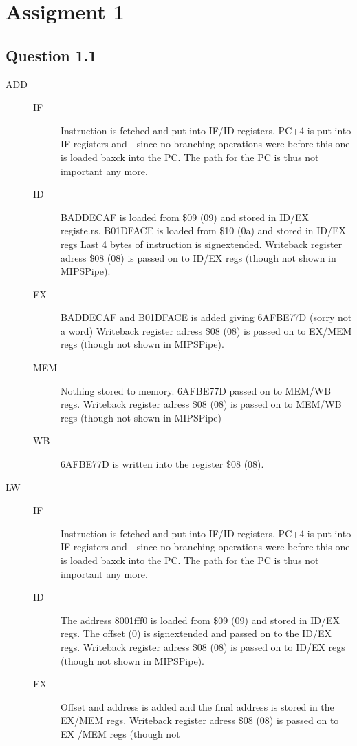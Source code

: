 \section{Assigment 1}
\subsection{Question 1.1}
\begin{description}
\item[ADD]
	\begin{description}
	\item[IF]
	 Instruction is fetched and put into IF/ID registers.
	 PC+4 is put into IF registers and - since no branching operations were before this one is loaded baxck into the PC. The path for the PC is thus not important any more.
	\item[ID]
	 BADDECAF is loaded from \$09 (09) and stored in ID/EX registe.rs.
	 B01DFACE is loaded from \$10 (0a) and stored in ID/EX regs
	 Last 4 bytes of instruction is signextended.
	 Writeback register adress \$08 (08) is passed on to ID/EX regs (though not
	 shown in MIPSPipe).
	\item[EX]
	 BADDECAF and B01DFACE is added giving 6AFBE77D (sorry not a word)
	 Writeback register adress \$08 (08) is passed on to EX/MEM regs (though not
	 shown in MIPSPipe).
	\item[MEM]
	 Nothing stored to memory.
	 6AFBE77D passed on to MEM/WB regs.
	 Writeback register adress \$08 (08) is passed on to MEM/WB regs (though not
	 shown in MIPSPipe)
	\item[WB]
	 6AFBE77D is written into the register \$08 (08). 
	\end{description}	
\item[LW]
	\begin{description}
	\item[IF]
	 Instruction is fetched and put into IF/ID registers.
	 PC+4 is put into IF registers and - since no branching operations were before this one is loaded baxck into the PC. The path 	for the PC is thus not important any more.
	\item[ID]
	 The address 8001fff0 is loaded from \$09 (09) and stored in ID/EX regs.
	 The offset (0) is signextended and passed on to the ID/EX regs.
	 Writeback register adress \$08 (08) is passed on to ID/EX regs (though not
	 shown in MIPSPipe).
	\item[EX]
	 Offset and address is added and the final address is stored in the EX/MEM regs.
	 Writeback register adress \$08 (08) is passed on to EX /MEM regs (though not

\end{description}
\end{description}
